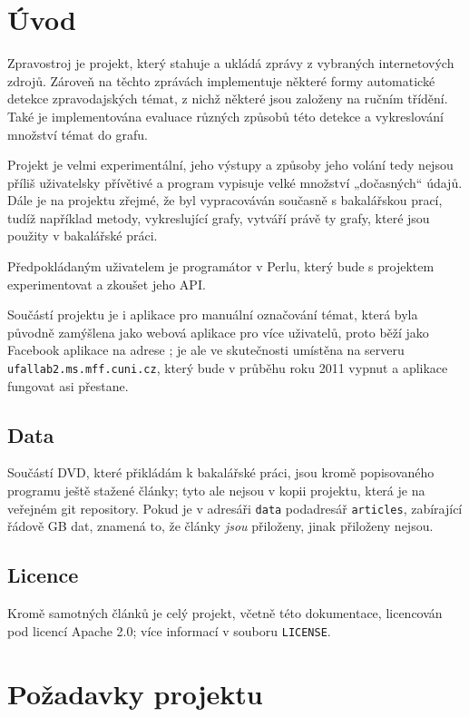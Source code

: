 \documentclass[12pt,a4paper]{report}
\def\uv#1{„#1“}
\begin{document}
    

\tableofcontents


\chapter{Úvod}
Zpravostroj je projekt, který stahuje a ukládá zprávy z vybraných internetových zdrojů. Zároveň na těchto zprávách implementuje některé formy automatické detekce zpravodajských témat, z nichž některé jsou založeny na ručním třídění. Také je implementována evaluace různých způsobů této detekce a vykreslování množství témat do grafu.

Projekt je velmi experimentální, jeho výstupy a způsoby jeho volání tedy nejsou příliš uživatelsky přívětivé a program vypisuje velké množství \uv{dočasných} údajů. Dále je na projektu zřejmé, že byl vypracováván současně s bakalářskou prací, tudíž například metody, vykreslující grafy, vytváří právě ty grafy, které jsou použity v bakalářské práci.

Předpokládaným uživatelem je programátor v Perlu, který bude s projektem experimentovat a zkoušet jeho API.


Součástí projektu je i aplikace pro manuální označování témat, která byla původně zamýšlena jako webová aplikace pro více uživatelů, proto běží jako Facebook aplikace na adrese ; je ale ve skutečnosti umístěna na serveru \texttt{ufallab2.ms.mff.cuni.cz}, který bude v průběhu roku 2011 vypnut a aplikace fungovat asi přestane.

\section{Data}
\label{sec:data}
Součástí DVD, které přikládám k bakalářské práci, jsou kromě popisovaného programu ještě stažené články; tyto ale nejsou v kopii projektu, která je na veřejném git repository. Pokud je v adresáři \texttt{data} podadresář \texttt{articles}, zabírající řádově GB dat, znamená to, že články \emph{jsou} přiloženy, jinak přiloženy nejsou.

\section{Licence}
Kromě samotných článků je celý projekt, včetně této dokumentace, licencován pod licencí Apache 2.0; více informací v souboru \texttt{LICENSE}.

\chapter{Požadavky projektu}
\end{document}
